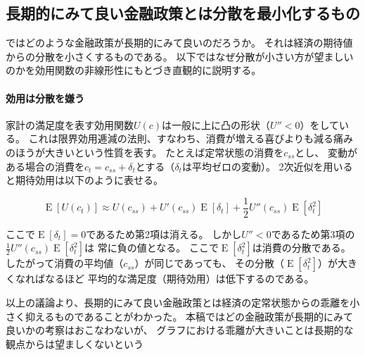 \subsection{長期的にみて良い金融政策とは分散を最小化するもの}
\label{sec:model_preparation_criteria_variance_minimization}
ではどのような金融政策が長期的にみて良いのだろうか。
それは経済の期待値からの分散を小さくするものである。
以下ではなぜ分散が小さい方が望ましいのかを効用関数の非線形性にもとづき直観的に説明する。

\paragraph{効用は分散を嫌う}\label{sec:model_preparation_criteria_variance_minimization_risk_aversion}

家計の満足度を表す効用関数\(U(c)\)は一般に上に凸の形状（\(U''<0\)）をしている。
これは限界効用逓減の法則、すなわち、消費が増える喜びよりも減る痛みのほうが大きいという性質を表す。
たとえば定常状態の消費を\(c_{ss}\)とし、
変動がある場合の消費を\(c_t=c_{ss}+\delta_t\)とする（\(\delta_t\)は平均ゼロの変動）。
2次近似を用いると期待効用は以下のように表せる。



\begin{equation}
\operatorname{E}[U(c_t)]\approx U(c_{ss})+U'(c_{ss})\operatorname{E}[\delta_t]+\frac{1}{2}U''(c_{ss})\operatorname{E}[\delta_t^2]
\label{eq:model_preparation_criteria_utility_approximation}
\end{equation}

ここで\(\operatorname{E}[\delta_t]=0\)であるため第2項は消える。
しかし\(U''<0\)であるため第3項の\(\frac{1}{2}U''(c_{ss})\operatorname{E}[\delta_t^2]\)は
常に負の値となる。
ここで\(\operatorname{E}[\delta_t^2]\)は消費の分散である。
したがって消費の平均値（\(c_{ss}\)）が同じであっても、
その分散（\(\operatorname{E}[\delta_t^2]\)）が大きくなればなるほど
平均的な満足度（期待効用）は低下するのである。

以上の議論より、長期的にみて良い金融政策とは経済の定常状態からの乖離を小さく抑えるものであることがわかった。
本稿ではどの金融政策が長期的にみて良いかの考察はおこなわないが、
グラフにおける乖離が大きいことは長期的な観点からは望ましくないという